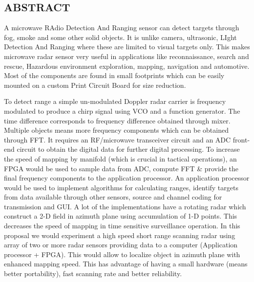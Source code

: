 \begin{center}
\section*{ABSTRACT}
\end{center}
\begin{Large}
\begin{onehalfspace}
A microwave RAdio Detection And Ranging sensor can detect targets through fog, smoke and some other solid objects. It is unlike camera, ultrasonic, LIght Detection And Ranging where these are limited to visual targets only. This makes microwave radar sensor very useful in applications like reconnaissance, search and rescue, Hazardous environment exploration, mapping, navigation and automotive. Most of the components are found in small footprints which can be easily mounted on a custom Print Circuit Board for size reduction.
 
\hspace{0.5in} To detect range a simple un-modulated Doppler radar carrier is frequency modulated to produce a chirp signal using VCO and a function generator. The time difference corresponds to frequency difference obtained through mixer. Multiple objects means more frequency components which can be obtained through FFT. It requires an RF/microwave transceiver circuit and an ADC front-end circuit to obtain the digital data for further digital processing. To increase the speed of mapping by manifold (which is crucial in tactical operations), an FPGA would be used to sample data from ADC, compute FFT \& provide the final frequency components to the application processor. An application processor would be used to implement algorithms for calculating ranges, identify targets from data available through other sensors, source and channel coding for transmission and GUI. A lot of the implementations have a rotating radar which construct a 2-D field in azimuth plane using accumulation of 1-D points. This decreases the speed of mapping in time sensitive surveillance operation. In this proposal we would experiment a high speed short range scanning radar using array of two or more radar sensors providing data to a computer (Application processor + FPGA). This would allow to localize object in azimuth plane with enhanced mapping speed. This has advantage of having a small hardware (means better portability), fast scanning rate and better reliability.
\end{onehalfspace}
\end{Large}